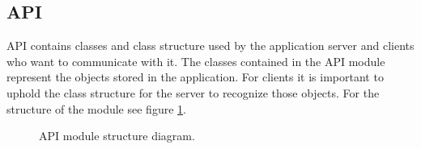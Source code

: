\documentclass[10pt]{article}
\begin{document}
\subsection{API}
API contains classes and class structure used by the application server and clients who want to communicate with it. The classes contained in the API module represent the objects stored in the application. For clients it is important to uphold the class structure for the server to recognize those objects. For the structure of the module see figure \ref{fig:apiuml}.
\begin{figure}[b]
\centering
{}
\caption{API module structure diagram.}
\label{fig:apiuml}
\end{figure}
\end{document}
